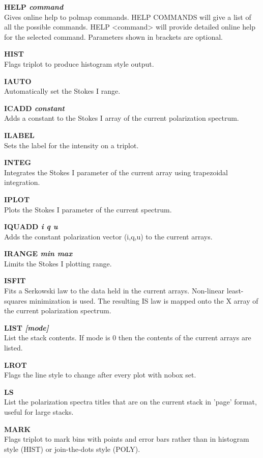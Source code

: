 {\bf HELP \it command} \\
Gives online help to polmap commands. HELP COMMANDS will give a list of
all the possible commands. HELP <command> will provide detailed online
help for the selected command. Parameters shown in brackets are optional.

{\bf HIST} \\
Flags triplot to produce histogram style output.


{\bf IAUTO} \\
Automatically set the Stokes I range.

{\bf ICADD \it constant} \\
Adds a constant to the Stokes I array of the current polarization spectrum.

{\bf ILABEL} \\
Sets the label for the intensity on a triplot.

{\bf INTEG} \\
 Integrates the Stokes I parameter of the current array
using trapezoidal integration.

{\bf IPLOT } \\
Plots the Stokes I parameter of the current spectrum.

{\bf IQUADD \it i q u} \\
Adds the constant polarization vector (i,q,u) to the current arrays.

{\bf IRANGE \it  min max } \\
Limits the Stokes I  plotting range.

{\bf ISFIT} \\
Fits a Serkowski law to the data held in the current arrays.
Non-linear least-squares minimization is used.
The resulting IS law is mapped onto the X array of the current
polarization spectrum.

{\bf LIST \it  [mode] } \\
List the stack contents. If  mode is 0 then the contents of the current
arrays are listed.

{\bf LROT} \\
Flags the line style to change after every plot with nobox set.

{\bf LS} \\
List the polarization spectra titles that are on the current stack in
'page' format, useful for large stacks.

{\bf MARK} \\
Flags triplot to mark bins with points and error bars rather than in
histogram style (HIST) or join-the-dots style (POLY).

